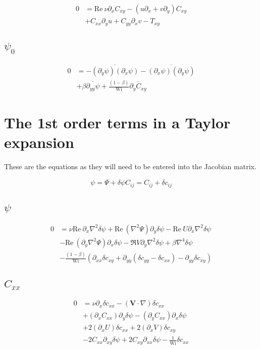 \documentclass[12,a4paper]{article}
\newcommand{\dd}[1]{\partial_{#1}}
\newcommand{\lpl}{\nabla^{2}}
\newcommand{\bih}{\nabla^{4}}
\newcommand{\scij}{\delta c_{ij}}
\newcommand{\scxx}{\delta c_{xx}}
\newcommand{\scyy}{\delta c_{yy}}
\newcommand{\scxy}{\delta c_{xy}}
\newcommand{\spsi}{\delta \psi}
\newcommand{\Wi}{\mathrm{Wi}}
\newcommand{\Rey}{\mathrm{Re \ }}
\begin{document}
\begin{align}
    0 &= \Rey \nu \dd{x} C_{xy} - (u\dd{x} + v\dd{y}) C_{xy} \nonumber\\
    &+ C_{xx} \dd{y}u + C_{yy}\dd{x}v - T_{xy}
\end{align}

\subsection{$\psi_{0}$}

\begin{align}
    0 &= - \overline{(\dd{y}\psi)(\dd{x}\psi)} - \overline{(\dd{x}\psi)(\dd{y}\psi)} \nonumber\\
    &+ \beta \overline{\dd{yy}\psi} + \frac{(1-\beta)}{\Wi}\overline{\dd{y}C_{xy}}
\end{align}

\section{The 1st order terms in a Taylor expansion}

These are the equations as they will need to be entered into the Jacobian matrix.

\begin{align}
\psi = \Psi + \spsi
C_{ij} = C_{ij} +\scij
\end{align}

\subsection{$\psi$}

\begin{align}
    0 &= \nu\Rey\dd{x}\lpl\spsi +  \Rey (\lpl\Psi) \dd{y}\spsi - \Rey U \dd{x}\lpl \spsi \nonumber\\
    &- \Rey (\dd{y}\lpl \Psi) \dd{x} \spsi - \Re V \dd{y} \lpl \spsi + \beta \bih \spsi \nonumber\\
    &- \frac{(1-\beta)}{\Wi} \left( \dd{xx} \scxy +\dd{yy} (\scyy -\scxx) - \dd{yy} \scxy \right)
\end{align}

\subsection{$C_{xx}$}

\begin{align}
    0 &= \nu \dd{x} \scxx - (\mathbf{V}\cdot \nabla) \scxx \nonumber \\
    &+ (\dd{x}C_{xx})\dd{y}\spsi - (\dd{y}C_{xx})\dd{x} \spsi \nonumber\\
    &+ 2(\dd{x} U) \scxx + 2(\dd{x} V) \scxy \nonumber\\
    &- 2C_{xx}\dd{xy} \spsi + 2C_{xy}\dd{xx}\spsi - \frac{1}{\Wi}\scxx
\end{align}
\end{document}
